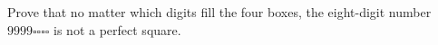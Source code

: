 Prove that no matter which digits fill the four boxes, the eight-digit number $9999\square\square\square\square$ is not a perfect square.
